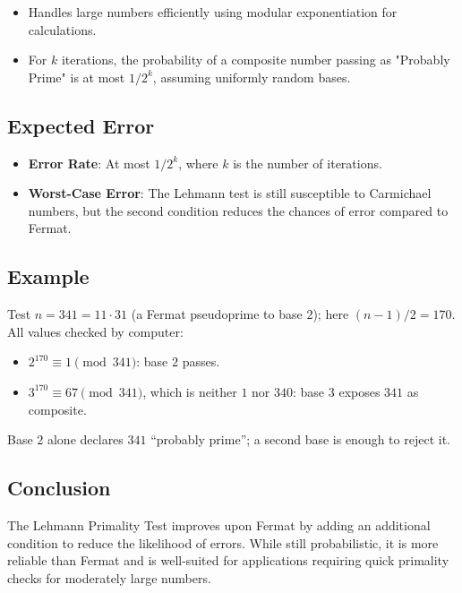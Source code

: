 \documentclass[12pt]{article}
\begin{document}
\begin{itemize}
    \item Handles large numbers efficiently using modular exponentiation for calculations.
    \item For \( k \) iterations, the probability of a composite number passing as "Probably Prime" is at most \( 1 / 2^k \), assuming uniformly random bases.
\end{itemize}

\subsection*{Expected Error}

\begin{itemize}
    \item \textbf{Error Rate}: At most \( 1 / 2^k \), where \( k \) is the number of iterations.
    \item \textbf{Worst-Case Error}: The Lehmann test is still susceptible to Carmichael numbers, but the second condition reduces the chances of error compared to Fermat.
\end{itemize}

\subsection*{Example}

Test \( n = 341 = 11 \cdot 31 \) (a Fermat pseudoprime to base \( 2 \)); here \( (n-1)/2 = 170 \). All values checked by computer:
\begin{itemize}
    \item \( 2^{170} \equiv 1 \pmod{341} \): base \( 2 \) passes.
    \item \( 3^{170} \equiv 67 \pmod{341} \), which is neither \( 1 \) nor \( 340 \): base \( 3 \) exposes \( 341 \) as composite.
\end{itemize}
Base \( 2 \) alone declares \( 341 \) ``probably prime''; a second base is enough to reject it.

\subsection*{Conclusion}

The Lehmann Primality Test improves upon Fermat by adding an additional condition to reduce the likelihood of errors. While still probabilistic, it is more reliable than Fermat and is well-suited for applications requiring quick primality checks for moderately large numbers.
\end{document}
